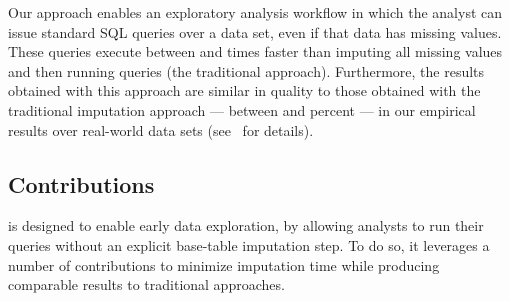 

Our approach enables an exploratory analysis workflow in which the analyst can issue
standard SQL queries over a data set, even if that data has missing values.
These queries execute between \lowxalphazero{} and \highxalphazero{} times faster than
imputing all missing values and then running queries (the traditional approach). Furthermore, the results obtained with this approach
are similar in quality to those obtained with the traditional imputation approach
--- between \lowsmapealphazero{} and \highsmapealphaone{}
percent --- in our empirical results over real-world data sets (see~
for details).


\subsection{Contributions}
\ProjectName{} is designed to enable early data exploration, by allowing analysts to run
their queries without an explicit base-table imputation step. To do so, it leverages a number of contributions
to minimize imputation time while producing comparable results to traditional approaches.

